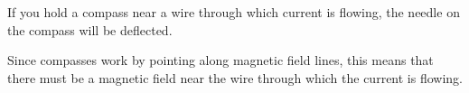 If you hold a compass near a wire through which current is
flowing, the needle on the compass will be deflected.



Since compasses work by pointing along magnetic field lines, this means that there must be a magnetic field near the wire through which the current is flowing.




